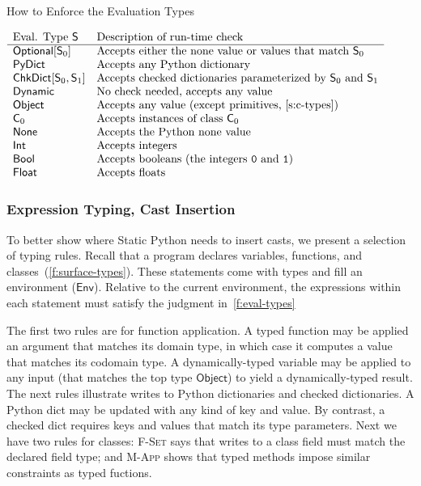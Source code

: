 \documentclass[english,cleveref,submission]{programming}
\newcommand{\SP}{Static Python}
\newcommand{\code}[1]{\texttt{#1}}
\newcommand{\typefont}[1]{\mathsf{#1}}
\newcommand{\paramtype}[2]{#1[#2]}
\newcommand{\spteval}{\typefont{S}}
\newcommand{\sptclass}{\typefont{C}}
\newcommand{\sptint}{\typefont{Int}}
\newcommand{\sptbool}{\typefont{Bool}}
\newcommand{\sptfloat}{\typefont{Float}}
\newcommand{\sptdyn}{\typefont{Dynamic}}
\newcommand{\sptobject}{\typefont{Object}}
\newcommand{\sptnone}{\typefont{None}}
\newcommand{\sptoptional}[1]{\paramtype{\typefont{Optional}}{#1}}
\newcommand{\sptrawpydict}{\typefont{PyDict}}
\newcommand{\sptchkdict}[2]{\paramtype{\typefont{ChkDict}}{#1, #2}}
\newcommand{\sptenv}{\typefont{Env}}
\newcommand{\trule}[1]{\textsc{#1}}
\begin{document}
\begin{table}[t]
  \caption{How to Enforce the Evaluation Types}
  \label{t:cast}

  \(\begin{array}{l@{\quad}l}
    \mbox{Eval. Type $\spteval$} & \mbox{Description of run-time check} \\\hline
    \sptoptional{\spteval_0} & \mbox{Accepts either the none value or values that match $\spteval_0$} \\
    \sptrawpydict & \mbox{Accepts any Python dictionary} \\
    \sptchkdict{\spteval_0}{\spteval_1} & \mbox{Accepts checked dictionaries parameterized by $\spteval_0$ and $\spteval_1$} \\
    \sptdyn & \mbox{No check needed, accepts any value} \\
    \sptobject & \mbox{Accepts any value (except primitives,~\cref{s:c-types})} \\
    \sptclass_0 & \mbox{Accepts instances of class $\sptclass_0$} \\
    \sptnone & \mbox{Accepts the Python none value} \\
    \sptint & \mbox{Accepts integers} \\
    \sptbool & \mbox{Accepts booleans (the integers \code{0} and \code{1})} \\
    \sptfloat & \mbox{Accepts floats}
  \end{array}\)
\end{table}


\subsubsection{Expression Typing, Cast Insertion}

To better show where \SP{} needs to insert casts, we present a selection of typing rules.
Recall that a program declares variables, functions, and classes~(\cref{f:surface-types}).
These statements come with types and fill an environment ($\sptenv$).
Relative to the current environment, the expressions within each statement must
satisfy the judgment in~\cref{f:eval-types} 

The first two rules are for function application.
A typed function may be applied an argument that matches its domain type,
in which case it computes a value that matches its codomain type.
A dynamically-typed variable may be applied to any input (that matches the top
type $\sptobject$) to yield a dynamically-typed result.
The next rules illustrate writes to Python dictionaries and checked dictionaries.
A Python dict may be updated with any kind of key and value.
By contrast, a checked dict requires keys and values that match its type parameters.
Next we have two rules for classes:
\trule{F-Set} says that writes to a class field must match the declared field
type; and \trule{M-App} shows that typed methods impose similar constraints as
typed fuctions.
\end{document}
